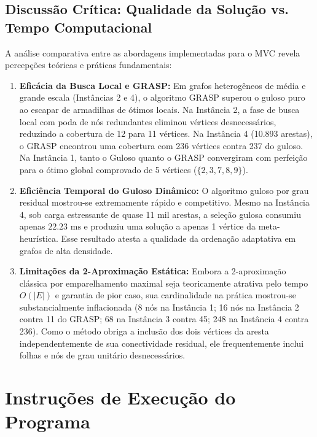 \documentclass[12pt,a4paper]{article}
\begin{document}
\subsection{Discussão Crítica: Qualidade da Solução vs. Tempo Computacional}
A análise comparativa entre as abordagens implementadas para o MVC revela percepções teóricas e práticas fundamentais:
\begin{enumerate}
    \item \textbf{Eficácia da Busca Local e GRASP:} Em grafos heterogêneos de média e grande escala (Instâncias 2 e 4), o algoritmo GRASP superou o guloso puro ao escapar de armadilhas de ótimos locais. Na Instância 2, a fase de busca local com poda de nós redundantes eliminou vértices desnecessários, reduzindo a cobertura de 12 para 11 vértices. Na Instância 4 (10.893 arestas), o GRASP encontrou uma cobertura com 236 vértices contra 237 do guloso. Na Instância 1, tanto o Guloso quanto o GRASP convergiram com perfeição para o ótimo global comprovado de 5 vértices ($\{2, 3, 7, 8, 9\}$).
    \item \textbf{Eficiência Temporal do Guloso Dinâmico:} O algoritmo guloso por grau residual mostrou-se extremamente rápido e competitivo. Mesmo na Instância 4, sob carga estressante de quase 11 mil arestas, a seleção gulosa consumiu apenas $22.23\text{ ms}$ e produziu uma solução a apenas 1 vértice da meta-heurística. Esse resultado atesta a qualidade da ordenação adaptativa em grafos de alta densidade.
    \item \textbf{Limitações da 2-Aproximação Estática:} Embora a 2-aproximação clássica por emparelhamento maximal seja teoricamente atrativa pelo tempo $O(|E|)$ e garantia de pior caso, sua cardinalidade na prática mostrou-se substancialmente inflacionada (8 nós na Instância 1; 16 nós na Instância 2 contra 11 do GRASP; 68 na Instância 3 contra 45; 248 na Instância 4 contra 236). Como o método obriga a inclusão dos dois vértices da aresta independentemente de sua conectividade residual, ele frequentemente inclui folhas e nós de grau unitário desnecessários.
\end{enumerate}

\section{Instruções de Execução do Programa}
\end{document}
